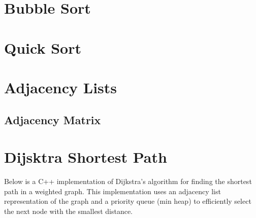 \section{Bubble Sort}

\section{Quick Sort}


\section{Adjacency Lists}

\subsection{Adjacency Matrix}




\section{Dijsktra Shortest Path}

Below is a C++ implementation of Dijkstra's algorithm for finding the shortest path in a weighted graph.
This implementation uses an adjacency list representation of the graph
and a priority queue (min heap) to efficiently select the next node with the smallest distance.


